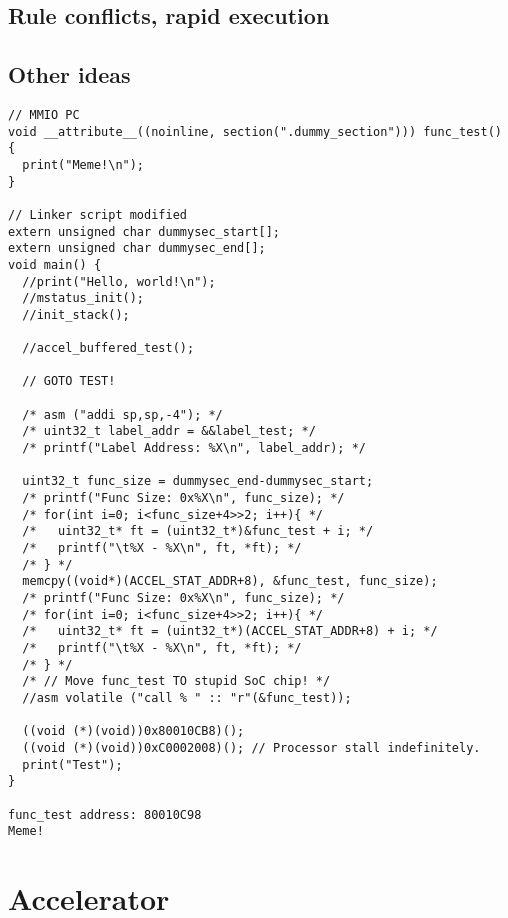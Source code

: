 \documentclass[a4paper,8pt]{report}
\begin{document}
\subsection{Rule conflicts, rapid execution}


\subsection{Other ideas}




\begin{verbatim}
// MMIO PC
void __attribute__((noinline, section(".dummy_section"))) func_test() {
  print("Meme!\n");
}

// Linker script modified
extern unsigned char dummysec_start[];
extern unsigned char dummysec_end[];
void main() {
  //print("Hello, world!\n");
  //mstatus_init();
  //init_stack();

  //accel_buffered_test();

  // GOTO TEST!

  /* asm ("addi sp,sp,-4"); */
  /* uint32_t label_addr = &&label_test; */
  /* printf("Label Address: %X\n", label_addr); */

  uint32_t func_size = dummysec_end-dummysec_start;
  /* printf("Func Size: 0x%X\n", func_size); */
  /* for(int i=0; i<func_size+4>>2; i++){ */
  /*   uint32_t* ft = (uint32_t*)&func_test + i; */
  /*   printf("\t%X - %X\n", ft, *ft); */
  /* } */
  memcpy((void*)(ACCEL_STAT_ADDR+8), &func_test, func_size);
  /* printf("Func Size: 0x%X\n", func_size); */
  /* for(int i=0; i<func_size+4>>2; i++){ */
  /*   uint32_t* ft = (uint32_t*)(ACCEL_STAT_ADDR+8) + i; */
  /*   printf("\t%X - %X\n", ft, *ft); */
  /* } */
  /* // Move func_test TO stupid SoC chip! */
  //asm volatile ("call % " :: "r"(&func_test));

  ((void (*)(void))0x80010CB8)();
  ((void (*)(void))0xC0002008)(); // Processor stall indefinitely.
  print("Test");
}

func_test address: 80010C98
Meme!
\end{verbatim}





\section{Accelerator}
\end{document}
